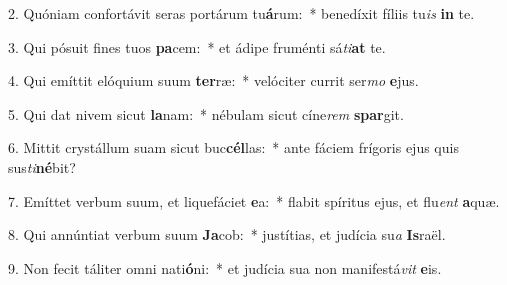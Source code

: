 2. Quóniam confortávit seras portárum tu\textbf{á}rum:~*  benedíxit fíliis tu\textit{is} \textbf{in} te.\

3. Qui pósuit fines tuos \textbf{pa}cem:~*  et ádipe fruménti sá\textit{ti}\textbf{at} te.\

4. Qui emíttit elóquium suum \textbf{ter}ræ:~*  velóciter currit ser\textit{mo} \textbf{e}jus.\

5. Qui dat nivem sicut \textbf{la}nam:~*  nébulam sicut cíne\textit{rem} \textbf{spar}git.\

6. Mittit crystállum suam sicut buc\textbf{cél}las:~*  ante fáciem frígoris ejus quis sus\textit{ti}\textbf{né}bit?\

7. Emíttet verbum suum, et liquefáciet \textbf{e}a:~*  flabit spíritus ejus, et flu\textit{ent} \textbf{a}quæ.\

8. Qui annúntiat verbum suum \textbf{Ja}cob:~*  justítias, et judícia su\textit{a} \textbf{Is}raël.\

9. Non fecit táliter omni nati\textbf{ó}ni:~*  et judícia sua non manifestá\textit{vit} \textbf{e}is.\


